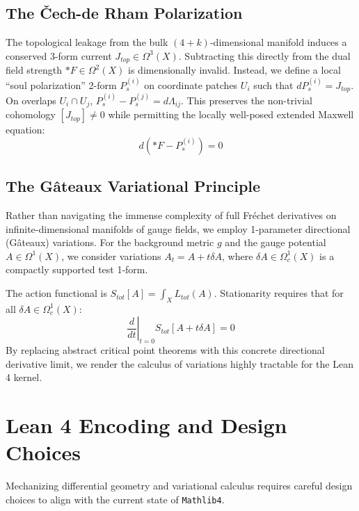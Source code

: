\documentclass[11pt, a4paper]{article}
\begin{document}
\subsection{The \v{C}ech-de Rham Polarization}
The topological leakage from the bulk $(4+k)$-dimensional manifold induces a conserved 3-form current $J_{top} \in \Omega^3(X)$. Subtracting this directly from the dual field strength $*F \in \Omega^2(X)$ is dimensionally invalid. Instead, we define a local ``soul polarization'' 2-form $P_s^{(i)}$ on coordinate patches $U_i$ such that $dP_s^{(i)} = J_{top}$. On overlaps $U_i \cap U_j$, $P_s^{(i)} - P_s^{(j)} = d\Lambda_{ij}$. This preserves the non-trivial cohomology $[J_{top}] \neq 0$ while permitting the locally well-posed extended Maxwell equation:
\begin{equation}
    d(*F - P_s^{(i)}) = 0
\end{equation}

\subsection{The G\^ateaux Variational Principle}
Rather than navigating the immense complexity of full Fr\'echet derivatives on infinite-dimensional manifolds of gauge fields, we employ 1-parameter directional (G\^ateaux) variations. For the background metric $g$ and the gauge potential $A \in \Omega^1(X)$, we consider variations $A_t = A + t \delta A$, where $\delta A \in \Omega^1_c(X)$ is a compactly supported test 1-form.

The action functional is $S_{tot}[A] = \int_X L_{tot}(A)$. Stationarity requires that for all $\delta A \in \Omega^1_c(X)$:
\begin{equation}
    \left. \frac{d}{dt} \right|_{t=0} S_{tot}[A + t\delta A] = 0
\end{equation}
By replacing abstract critical point theorems with this concrete directional derivative limit, we render the calculus of variations highly tractable for the Lean 4 kernel.

\section{Lean 4 Encoding and Design Choices}
Mechanizing differential geometry and variational calculus requires careful design choices to align with the current state of \texttt{Mathlib4}.
\end{document}
